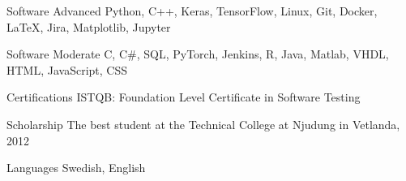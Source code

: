 

\begin{cvskills}

  \cvskill
    {Software Advanced} %
    {Python, C++, Keras, TensorFlow, Linux, Git, Docker, LaTeX, Jira, Matplotlib, Jupyter} %

  \cvskill
    {Software Moderate} %
    {C, C\#, SQL, PyTorch, Jenkins, R, Java, Matlab, VHDL, HTML, JavaScript, CSS} %

  \cvskill
  {Certifications} %
  {ISTQB: Foundation Level Certificate in Software Testing} %

  \cvskill
    {Scholarship} %
    {The best student at the Technical College at Njudung in Vetlanda, 2012} %

  \cvskill
    {Languages} %
    {Swedish, English} %

\end{cvskills}
